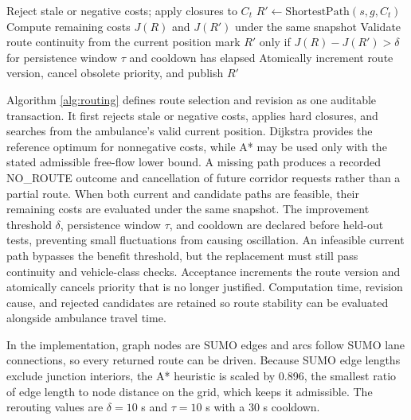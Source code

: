 \begin{algorithm}[H]
\caption{Congestion-aware route selection and stable rerouting}
\label{alg:routing}
Reject stale or negative costs; apply closures to $C_t$\;
$R'\leftarrow \mathrm{ShortestPath}(s,g,C_t)$\;
Compute remaining costs $J(R)$ and $J(R')$ under the same snapshot\;
Validate route continuity from the current position\;
{mark $R'$ only if $J(R)-J(R')>\delta$ for persistence window $\tau$ and cooldown has elapsed\;}
Atomically increment route version, cancel obsolete priority, and publish $R'$\;
\end{algorithm}

Algorithm \ref{alg:routing} defines route selection and revision as one auditable transaction. It first rejects stale or negative costs, applies hard closures, and searches from the ambulance's valid current position. Dijkstra provides the reference optimum for nonnegative costs, while A* may be used only with the stated admissible free-flow lower bound. A missing path produces a recorded NO\_ROUTE outcome and cancellation of future corridor requests rather than a partial route. When both current and candidate paths are feasible, their remaining costs are evaluated under the same snapshot. The improvement threshold $\delta$, persistence window $\tau$, and cooldown are declared before held-out tests, preventing small fluctuations from causing oscillation. An infeasible current path bypasses the benefit threshold, but the replacement must still pass continuity and vehicle-class checks. Acceptance increments the route version and atomically cancels priority that is no longer justified. Computation time, revision cause, and rejected candidates are retained so route stability can be evaluated alongside ambulance travel time.

In the implementation, graph nodes are SUMO edges and arcs follow SUMO lane connections, so every returned route can be driven. Because SUMO edge lengths exclude junction interiors, the A* heuristic is scaled by 0.896, the smallest ratio of edge length to node distance on the grid, which keeps it admissible. The rerouting values are $\delta=10$ s and $\tau=10$ s with a 30 s cooldown.

